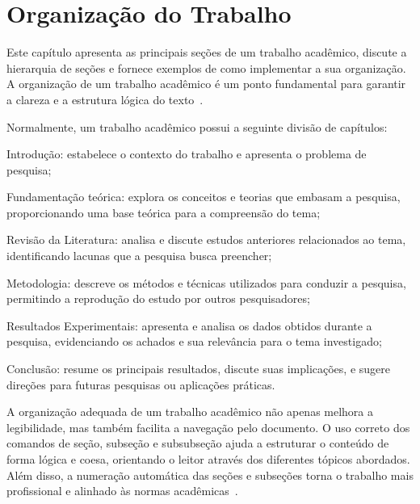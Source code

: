 
\chapter{Organização do Trabalho}
\label{cap:organizacao}

Este capítulo apresenta as principais seções de um trabalho acadêmico, discute a hierarquia de seções  e fornece exemplos de como implementar a sua organização. A organização de um trabalho acadêmico é um ponto fundamental para garantir a clareza e a estrutura lógica do texto~\cite{severino}.

Normalmente, um trabalho acadêmico possui a seguinte divisão de capítulos:

\begin{alineas}
    \item Introdução: estabelece o contexto do trabalho e apresenta o problema de pesquisa;
    \item Fundamentação teórica: explora os conceitos e teorias que embasam a pesquisa, proporcionando uma base teórica para a compreensão do tema;
    \item Revisão da Literatura: analisa e discute estudos anteriores relacionados ao tema, identificando lacunas que a pesquisa busca preencher;
    \item Metodologia: descreve os métodos e técnicas utilizados para conduzir a pesquisa, permitindo a reprodução do estudo por outros pesquisadores;
    \item Resultados Experimentais: apresenta e analisa os dados obtidos durante a pesquisa, evidenciando os achados e sua relevância para o tema investigado;
    \item Conclusão: resume os principais resultados, discute suas implicações, e sugere direções para futuras pesquisas ou aplicações práticas.
\end{alineas}

A organização adequada de um trabalho acadêmico não apenas melhora a legibilidade, mas também facilita a navegação pelo documento. O uso correto dos comandos de seção, subseção e subsubseção ajuda a estruturar o conteúdo de forma lógica e coesa, orientando o leitor através dos diferentes tópicos abordados. Além disso, a numeração automática das seções e subseções torna o trabalho mais profissional e alinhado às normas acadêmicas~\cite{gil}.

